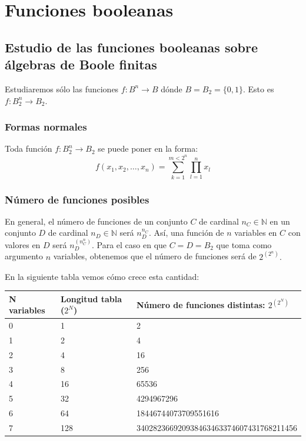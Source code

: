 \chapter{Funciones booleanas}

\section{Estudio de las funciones booleanas sobre álgebras de Boole finitas}

Estudiaremos sólo las funciones $f: B^{n} \rightarrow B$ dónde $B = B_{2} = \{0, 1\}.$ Esto es $f: B_{2}^{n} \rightarrow B_{2}.$

\subsection{Formas normales}
Toda función $f: B_{2}^{n} \rightarrow B_{2}$ se puede poner en la forma:
\[
f(x_{1}, x_{2}, \dots, x_{n}) = \sum_{k=1}^{m < 2^{n}} \prod_{l=1}^{n} x_{l}
\]

\subsection{Número de funciones posibles}
En general, el número de funciones de un conjunto $C$ de cardinal $n_{C} \in \mathbb{N}$ en un conjunto $D$ de cardinal $n_{D} \in \mathbb{N}$ será $n_{D}^{n_{C}}.$ Así, una función de $n$ variables en $C$ con valores en $D$ será $n_{D}^{(n_{C}^{n})}.$ Para el caso en que $C = D = B_{2}$ que toma como argumento $n$ variables, obtenemos que el número de funciones será de $2^{(2^{n})}.$ 

En la siguiente tabla vemos cómo crece esta cantidad:

\begin{table}[h]
\centering
\begin{tabular}{lll}
\hline
\textbf{N variables} & \textbf{Longitud tabla ($2^N$)} & \textbf{Número de funciones distintas: $2^{(2^{N})}$} \\
\hline
0 & 1 & 2 \\
1 & 2 & 4 \\
2 & 4 & 16 \\
3 & 8 & 256 \\
4 & 16 & 65536 \\
5 & 32 & 4294967296 \\
6 & 64 & 18446744073709551616 \\
7 & 128 & 340282366920938463463374607431768211456 \\
\hline
\end{tabular}
\end{table}

